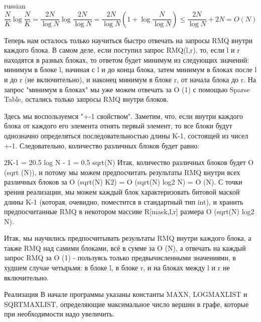 \documentclass{article}
\begin{document}
\begin{otherlanguage*}{russian}
    \[ \frac{N}{K} \log \frac{N}{K} = \frac{2N}{\log N} \log \frac{2N}{\log N} = \frac{2N}{\log N} (1 + \log \frac{N}{\log N}) \leq \frac{2N}{\log N} + 2N = O (N) \]

    Теперь нам осталось только научиться быстро отвечать на запросы RMQ внутри каждого блока. В самом деле, если поступил запрос RMQ(l,r), то, если l и r находятся в разных блоках, то ответом будет минимум из следующих значений: минимум в блоке l, начиная с l и до конца блока, затем минимум в блоках после l и до r (не включительно), и наконец минимум в блоке r, от начала блока до r. На запрос "минимум в блоках" мы уже можем отвечать за O (1) с помощью Sparse Table, остались только запросы RMQ внутри блоков.

    Здесь мы воспользуемся "+-1 свойством". Заметим, что, если внутри каждого блока от каждого его элемента отнять первый элемент, то все блоки будут однозначно определяться последовательностью длины K-1, состоящей из чисел +-1. Следовательно, количество различных блоков будет равно:

    2K-1 = 20.5 log N - 1 = 0.5 sqrt(N)
    Итак, количество различных блоков будет O (sqrt (N)), и потому мы можем предпосчитать результаты RMQ внутри всех различных блоков за O (sqrt(N) K2) = O (sqrt(N) log2 N) = O (N). С точки зрения реализации, мы можем каждый блок характеризовать битовой маской длины K-1 (которая, очевидно, поместится в стандартный тип int), и хранить предпосчитанные RMQ в некотором массиве R[mask,l,r] размера O (sqrt(N) log2 N).

    Итак, мы научились предпосчитывать результаты RMQ внутри каждого блока, а также RMQ над самими блоками, всё в сумме за O (N), а отвечать на каждый запрос RMQ за O (1) - пользуясь только предвычисленными значениями, в худшем случае четырьмя: в блоке l, в блоке r, и на блоках между l и r не включительно.

    Реализация
    В начале программы указаны константы MAXN, LOG\textunderscore MAXLIST и SQRT\textunderscore MAXLIST, определяющие максимальное число вершин в графе, которые при необходимости надо увеличить.
\end{otherlanguage*}
\end{document}
